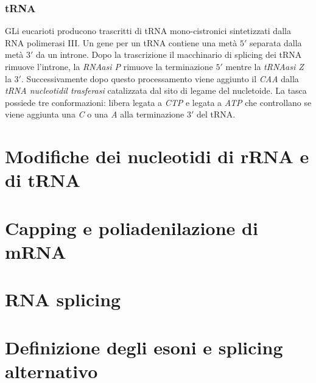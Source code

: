\subsubsection{tRNA}
GLi eucarioti producono trascritti di tRNA mono-cistronici sintetizzati dalla RNA polimerasi III. Un gene per un tRNA contiene una met\`a $5'$ separata dalla met\`a $3'$ da un
introne. Dopo la trascrizione il macchinario di splicing dei tRNA rimuove l'introne, la \emph{RNAasi P} rimuove la terminazione $5'$ mentre la \emph{tRNAasi Z} la $3'$. Successivamente
dopo questo processamento viene aggiunto il \emph{CAA} dalla \emph{tRNA nucleotidil trasferasi} catalizzata dal sito di legame del nucletoide. La tasca possiede tre conformazioni: libera
legata a \emph{CTP} e legata a \emph{ATP} che controllano se viene aggiunta una \emph{C} o una \emph{A} alla terminazione $3'$ del tRNA. 
\section{Modifiche dei nucleotidi di rRNA e di tRNA}

\section{Capping e poliadenilazione di mRNA}

\section{RNA splicing}

\section{Definizione degli esoni e splicing alternativo}
